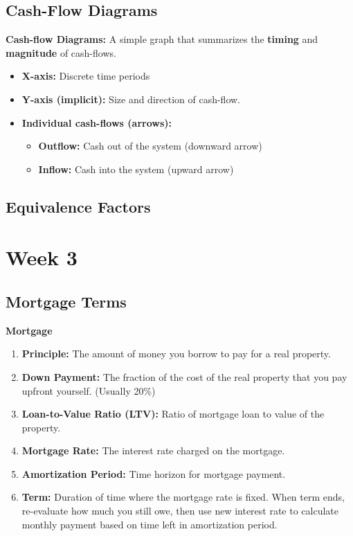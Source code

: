 \documentclass{article}
\begin{document}
    \subsection{Cash-Flow Diagrams}
        \begin{definition}
            \textbf{Cash-flow Diagrams:} A simple graph that summarizes the \textbf{timing} and \textbf{magnitude} of cash-flows.
            \begin{itemize}
                \item \textbf{X-axis:} Discrete time periods
                \item \textbf{Y-axis (implicit):} Size and direction of cash-flow.
                \item \textbf{Individual cash-flows (arrows):} 
                    \begin{itemize}
                        \item \textbf{Outflow:} Cash out of the system (downward arrow)
                        \item \textbf{Inflow:} Cash into the system (upward arrow)
                    \end{itemize}
            \end{itemize}
        \end{definition}
    
    \subsection{Equivalence Factors}
        
        

\section{Week 3}
    \subsection{Mortgage Terms}
        \begin{terminology}
            \textbf{Mortgage}
            \begin{enumerate}
                \item \textbf{Principle:} The amount of money you borrow to pay for a real property.
                \item \textbf{Down Payment:} The fraction of the cost of the real property that you pay upfront yourself. (Usually 20\%)
                \item \textbf{Loan-to-Value Ratio (LTV):} Ratio of mortgage loan to value of the property.
                \item \textbf{Mortgage Rate:} The interest rate charged on the mortgage. 
                \item \textbf{Amortization Period:} Time horizon for mortgage payment. 
                \item \textbf{Term:} Duration of time where the mortgage rate is fixed. When term ends, re-evaluate how much you still owe, then use new interest rate to calculate monthly payment based on time left in amortization period. 
            \end{enumerate}
        \end{terminology}
    
\end{document}
